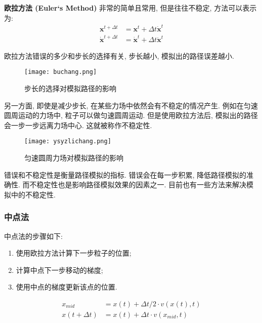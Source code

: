 \textbf{欧拉方法 (Euler‘s Method) }非常的简单且常用, 但是往往不稳定, 方法可以表示为: 
\begin{equation}
	\begin{split}
		\mathbf{x}^{t+\Delta t} &=\mathbf{x}^{t}+\Delta t \dot{\mathbf{x}}^{t} \\
		\dot{\mathbf{x}}^{t+\Delta t} &=\dot{\mathbf{x}}^{t}+\Delta t \ddot{\mathbf{x}}^{t}
	\end{split}
\end{equation}

欧拉方法错误的多少和步长的选择有关, 步长越小, 模拟出的路径误差越小. 

\begin{figure}[H]
	\centering
	\texttt{[image: buchang.png]}
	\caption{步长的选择对模拟路径的影响}
	\label{fig:buchang}
\end{figure}

另一方面, 即使是减少步长, 在某些力场中依然会有不稳定的情况产生. 例如在匀速圆周运动的力场中, 粒子可以做匀速圆周运动. 但是使用欧拉方法后, 模拟出的路径会一步一步远离力场中心. 这就被称作不稳定性. 

\begin{figure}[H]
	\centering
	\texttt{[image: ysyzlichang.png]}
	\caption{匀速圆周力场对模拟路径的影响}
	\label{fig:ysyz}
\end{figure}

错误和不稳定性是衡量路径模拟的指标. 错误会在每一步积累, 降低路径模拟的准确性. 而不稳定性也是影响路径模拟效果的因素之一. 目前也有一些方法来解决模拟中的不稳定性. 

\subsubsection{中点法}

中点法的步骤如下: 
\begin{enumerate}
	\item 使用欧拉方法计算下一步粒子的位置; 
	\item 计算中点下一步移动的梯度; 
	\item 使用中点的梯度更新该点的位置. 
\end{enumerate}

\begin{equation}
	\begin{split}
		x_{mid} &=x(t)+\Delta t / 2 \cdot v(x(t), t) \\
		x(t+\Delta t) &=x(t)+\Delta t \cdot v\left(x_{mid}, t\right)
	\end{split}
\end{equation}




